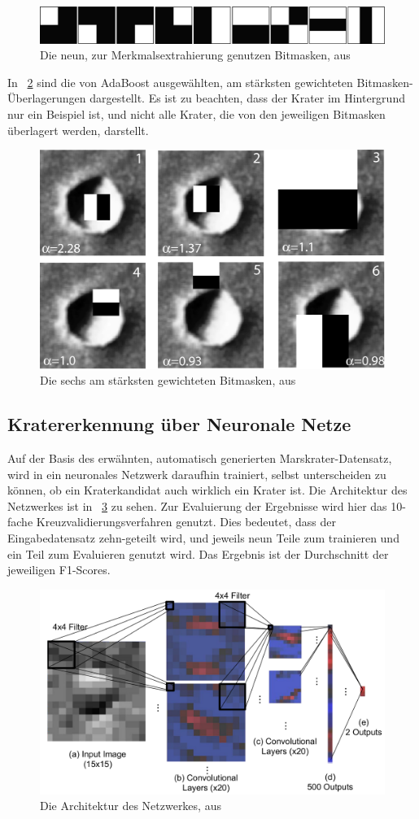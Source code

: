 \begin{figure}[h!]
	\centering
	\includegraphics[width=.8\textwidth,keepaspectratio]{images/BDS12/BDS12_01.png}
	\caption{Die neun, zur Merkmalsextrahierung genutzen Bitmasken, aus \cite{bandeira_12}}
	\label{fig:BDS12_01}
\end{figure}

In \figurename~\ref{fig:BDS12_02} sind die von AdaBoost ausgewählten, am stärksten gewichteten Bitmasken-Überlagerungen dargestellt. Es ist zu beachten, dass der Krater im Hintergrund nur ein Beispiel ist, und nicht alle Krater, die von den jeweiligen Bitmasken überlagert werden, darstellt.

\begin{figure}[h!]
	\centering
	\includegraphics[width=.5\textwidth,keepaspectratio]{images/BDS12/BDS12_02.png}
	\caption{Die sechs am stärksten gewichteten Bitmasken, aus \cite{bandeira_12}}
	\label{fig:BDS12_02}
\end{figure}

\subsection{Kratererkennung über Neuronale Netze}
\label{ssec:crater_detection_nn}
Auf der Basis des erwähnten, automatisch generierten Marskrater-Datensatz, wird in \cite{cohen_16} ein neuronales Netzwerk daraufhin trainiert, selbst unterscheiden zu können, ob ein Kraterkandidat auch wirklich ein Krater ist. Die Architektur des Netzwerkes ist in \figurename~\ref{fig:CLLD16_01} zu sehen. Zur Evaluierung der Ergebnisse wird hier das 10-fache Kreuzvalidierungsverfahren genutzt. Dies bedeutet, dass der Eingabedatensatz zehn-geteilt wird, und jeweils neun Teile zum trainieren und ein Teil zum Evaluieren genutzt wird. Das Ergebnis ist der Durchschnitt der jeweiligen F1-Scores.

\begin{figure}[H]
	\centering
	\includegraphics[width=.5\textwidth,keepaspectratio]{images/CLLD16/CLLD16_01.png}
	\caption{Die Architektur des Netzwerkes, aus \cite{cohen_16}}
	\label{fig:CLLD16_01}
\end{figure}

